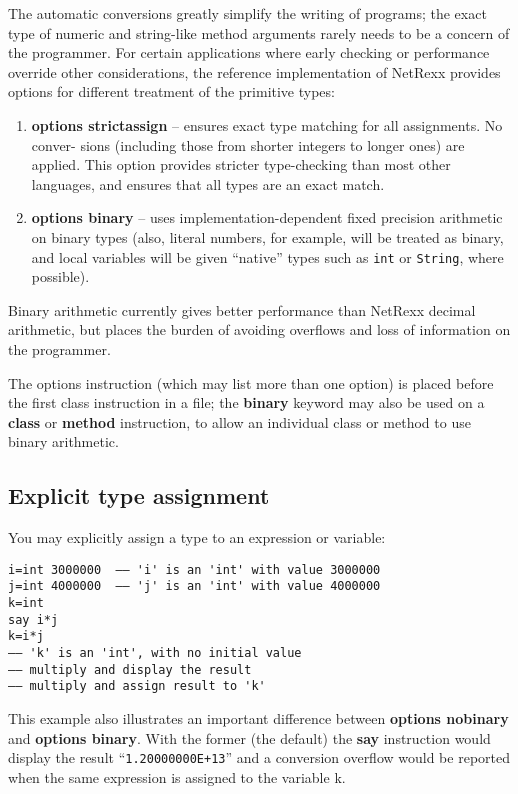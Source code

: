 The automatic conversions greatly simplify the writing of programs; the exact type of numeric and string-like method arguments rarely needs to be a concern of the programmer.
For certain applications where early checking or performance override
other considerations, the reference implementation of NetRexx
provides options for different treatment of the primitive types:
\begin{enumerate}
\item \textbf{options strictassign} – ensures exact type matching for all assignments. No conver- sions (including those from shorter integers to longer ones) are applied. This option provides stricter type-checking than most other languages, and ensures that all types are an exact match.
\item \textbf{options binary} – uses implementation-dependent fixed precision
arithmetic on binary types (also, literal numbers, for example, will
be treated as binary, and local variables will be given “native”
types such as \texttt{int} or \texttt{String}, where possible).
\end{enumerate}
Binary arithmetic currently gives better performance than NetRexx
decimal arithmetic, but places the burden of avoiding overflows and
loss of information on the programmer.

The options instruction (which may list more than one option) is placed before the first class instruction in a file; the \textbf{binary} keyword may also be used on a \textbf{class} or \textbf{method} instruction, to allow an individual class or method to use binary arithmetic.
\subsection{Explicit type assignment}
You may explicitly assign a type to an expression or variable:
\begin{lstlisting}[label=assigningtype,caption=Assigning Type]
i=int 3000000  –– 'i' is an 'int' with value 3000000
j=int 4000000  –– 'j' is an 'int' with value 4000000
k=int
say i*j
k=i*j
–– 'k' is an 'int', with no initial value
–– multiply and display the result
–– multiply and assign result to 'k'
\end{lstlisting}
This example also illustrates an important difference between
\textbf{options nobinary} and \textbf{options binary}. With the former
(the default) the \textbf{say} instruction would display the result
“\texttt{1.20000000E+13}” and a conversion overflow would be reported
when the same expression is assigned to the variable k.

